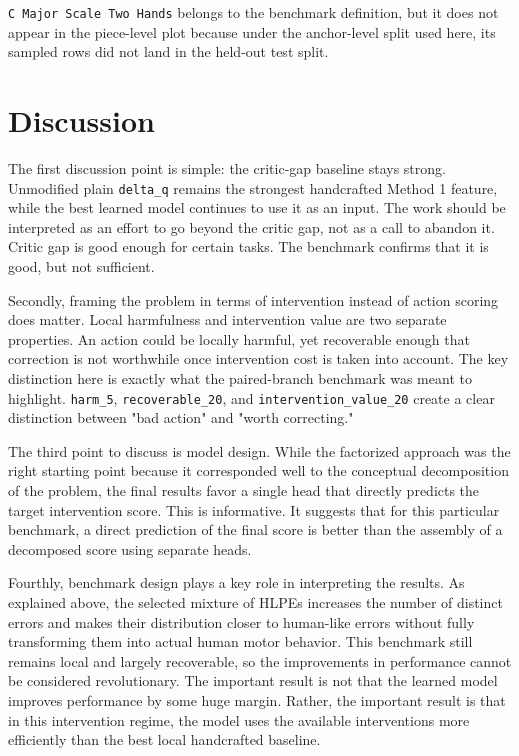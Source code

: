 \documentclass[11pt]{article}
\begin{document}
\texttt{C Major Scale Two Hands} belongs to the benchmark definition, but it does not appear in the piece-level plot because under the anchor-level split used here, its sampled rows did not land in the held-out test split.

\section{Discussion}

The first discussion point is simple: the critic-gap baseline stays strong. Unmodified plain \texttt{delta\_q} remains the strongest handcrafted Method 1 feature, while the best learned model continues to use it as an input. The work should be interpreted as an effort to go beyond the critic gap, not as a call to abandon it. Critic gap is good enough for certain tasks. The benchmark confirms that it is good, but not sufficient.

Secondly, framing the problem in terms of intervention instead of action scoring does matter. Local harmfulness and intervention value are two separate properties. An action could be locally harmful, yet recoverable enough that correction is not worthwhile once intervention cost is taken into account. The key distinction here is exactly what the paired-branch benchmark was meant to highlight. \texttt{harm\_5}, \texttt{recoverable\_20}, and \texttt{intervention\_value\_20} create a clear distinction between "bad action" and "worth correcting."

The third point to discuss is model design. While the factorized approach was the right starting point because it corresponded well to the conceptual decomposition of the problem, the final results favor a single head that directly predicts the target intervention score. This is informative. It suggests that for this particular benchmark, a direct prediction of the final score is better than the assembly of a decomposed score using separate heads.

Fourthly, benchmark design plays a key role in interpreting the results. As explained above, the selected mixture of HLPEs increases the number of distinct errors and makes their distribution closer to human-like errors without fully transforming them into actual human motor behavior. This benchmark still remains local and largely recoverable, so the improvements in performance cannot be considered revolutionary. The important result is not that the learned model improves performance by some huge margin. Rather, the important result is that in this intervention regime, the model uses the available interventions more efficiently than the best local handcrafted baseline.
\end{document}

